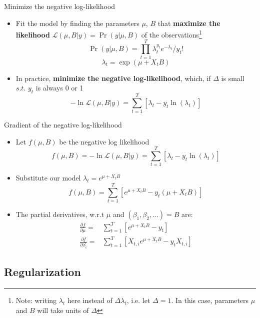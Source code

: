 \documentclass[svgnames,13pt]{beamer}
\DeclareRobustCommand{\emph}[1]{\textbf{{\color{emphasizecolor} #1}}}
\begin{document}
\begin{frame}{Minimize the negative log-likelihood}
\begin{itemize}
	\item <1->Fit the model by finding the parameters $\mu$, $B$ that \emph{maximize the likelihood} $\mathcal{L}(\mu,B|y) = \Pr(y|\mu,B)$ of the observations\footnote{Note: writing $\lambda_t$ here instead of $\Delta\lambda_t$, i.e. let $\Delta=1$. In this case, parameters $\mu$ and $B$ will take units of $\Delta$} \[\Pr(y|\mu,B) = \prod_{t=1}^T \lambda_t^{y_t} e^{-\lambda_t} / {y_t}! \]\[\lambda_t=\exp(\mu + X_t B)\]
	\item <2->In practice, \emph{minimize the negative log-likelihood}, which, if $\Delta$ is small $s.t.$ $y_t$ is always 0 or 1 \[ -\ln\mathcal{L}(\mu,B|y) =  \sum_{t=1}^T[ \lambda_t - y_t \ln(\lambda_t) ]\]
\end{itemize}
\end{frame} 

\begin{frame}{Gradient of the negative log-likelihood}
\begin{itemize}
	\item <1->Let $f(\mu,B)$ be the negative log likelihood \[f(\mu,B) = -\ln\mathcal{L}(\mu,B|y) =  \sum_{t=1}^T[ \lambda_t - y_t \ln(\lambda_t) ]\]
	\item <2->Substitute our model $\lambda_t=e^{\mu + X_t B}$ \[f(\mu,B) =  \sum_{t=1}^T[ e^{\mu + X_t B} - y_t (\mu + X_t B) ]\]
	\item <3->The partial derivatives, w.r.t $\mu$ and $(\beta_1,\beta_2,...)=B$ are:\[\begin{aligned}\frac{\partial f}{\partial	\mu}=&\sum_{t=1}^T[e^{\mu+X_t B}-y_t]\\\frac{\partial f}{\partial\beta_i}=&\sum_{t=1}^T[X_{t,i} e^{\mu+X_t B}-y_t X_{t,i}]\end{aligned}\]
\end{itemize}
\end{frame} 


\subsection{Regularization}
\end{document}
